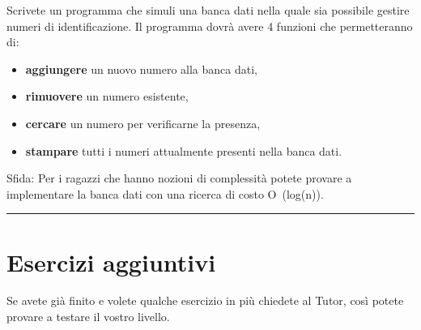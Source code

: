\documentclass[a4paper]{article}
\begin{document}
Scrivete un programma che simuli una banca dati nella quale sia possibile gestire numeri di identificazione.
Il programma dovrà avere 4 funzioni che permetteranno di:
\begin{itemize}
  \item \textbf{aggiungere} un nuovo numero alla banca dati,
  \item \textbf{rimuovere} un numero esistente,
  \item \textbf{cercare} un numero per verificarne la presenza,
  \item \textbf{stampare} tutti i numeri attualmente presenti nella banca dati.
\end{itemize}
Sfida: Per i ragazzi che hanno nozioni di complessità potete provare a implementare la banca dati con una ricerca di costo O\ (log(n)).

\noindent\rule{\linewidth}{0.4pt}
\section*{Esercizi aggiuntivi}
Se avete già finito e volete qualche esercizio in più chiedete al Tutor, così potete provare a testare il vostro livello.
\end{document}
